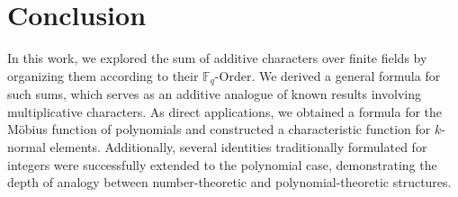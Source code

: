 \documentclass[12pt,a4paper]{article}
\theoremstyle{plain}
\theoremstyle{definition}
\numberwithin{equation}{section}
\begin{document}
    \section{Conclusion}
    In this work, we explored the sum of additive characters over finite fields by organizing them according to their \(\mathbb{F}_q\)-Order. We derived a general formula for such sums, which serves as an additive analogue of known results involving multiplicative characters. As direct applications, we obtained a formula for the Möbius function of polynomials and constructed a characteristic function for \(k\)-normal elements. Additionally, several identities traditionally formulated for integers were successfully extended to the polynomial case, demonstrating the depth of analogy between number-theoretic and polynomial-theoretic structures.
    
\end{document}
